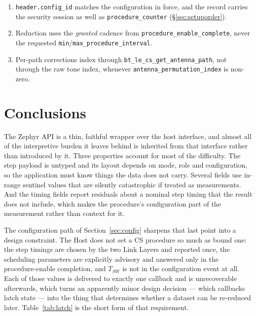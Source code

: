 \documentclass[11pt,a4paper]{article}
\newcommand{\code}[1]{\texttt{\small #1}}
\newcommand{\Tsw}{\ensuremath{T_{SW}}}
\begin{document}
\begin{enumerate}[leftmargin=1.7em,itemsep=2pt]
    the stored context belongs to a different procedure.
  \item \code{header.config\_\allowbreak{}id} matches the configuration in force, and the record carries the
    security session as well as \code{procedure\_\allowbreak{}counter} (\S\ref{sec:setuporder}).
  \item Reduction uses the \emph{granted} cadence from
    \code{procedure\_\allowbreak{}enable\_\allowbreak{}complete}, never the requested
    \code{min}/\code{max\_\allowbreak{}procedure\_\allowbreak{}interval}.
  \item Per-path corrections index through
    \code{bt\_\allowbreak{}le\_\allowbreak{}cs\_\allowbreak{}get\_\allowbreak{}antenna\_\allowbreak{}path}, not through the raw tone index, whenever
    \code{antenna\_\allowbreak{}permutation\_\allowbreak{}index} is non-zero.
\end{enumerate}

\section{Conclusions}

The Zephyr API is a thin, faithful wrapper over the host interface, and almost all of the
interpretive burden it leaves behind is inherited from that interface rather than introduced by it.
Three properties account for most of the difficulty. The step payload is untyped and its layout
depends on mode, role and configuration, so the application must know things the data does not carry.
Several fields use in-range sentinel values that are silently catastrophic if treated as
measurements. And the timing fields report residuals about a nominal step timing that the result does
not include, which makes the procedure's configuration part of the measurement rather than context
for it.

The configuration path of Section~\ref{sec:config} sharpens that last point into a design
constraint. The Host does not set a CS procedure so much as bound one: the step timings are chosen by
the two Link Layers and reported once, the scheduling parameters are explicitly advisory and answered
only in the procedure-enable completion, and \Tsw{} is not in the configuration event at all. Each of
those values is delivered to exactly one callback and is unrecoverable afterwards, which turns an
apparently minor design decision --- which callbacks latch state --- into the thing that determines
whether a dataset can be re-reduced later. Table~\ref{tab:latch} is the short form of that
requirement.
\end{document}
